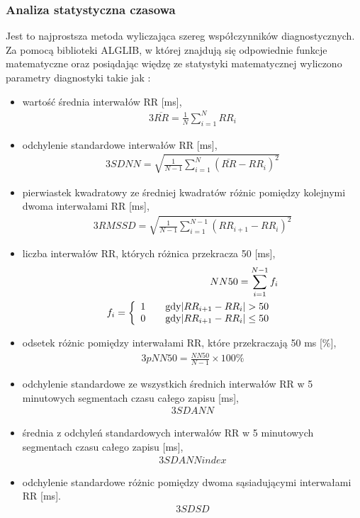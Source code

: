 \subsubsection{Analiza statystyczna czasowa }

\tab Jest to najprostsza metoda wyliczająca szereg współczynników diagnostycznych. Za pomocą biblioteki ALGLIB, w której znajdują się odpowiednie funkcje matematyczne oraz posiądając więdzę ze statystyki matematycznej wyliczono parametry diagnostyki takie jak : 

\vspace{10mm}

\begin{itemize} \itemsep0pt \parskip0pt 
\item wartość średnia interwałów RR [ms],
\begin{alignat*}{3}
\overline{RR} =  \frac{1}{N}  \sum_{i=1}^{N} RR_i
\end{alignat*}
\item odchylenie standardowe interwałów RR [ms],
\begin{alignat*}{3}
SDNN =  \sqrt{\frac{1}{N-1}\sum_{i=1}^{N} (\overline{RR} - RR_i)^{2}}
\end{alignat*}
\item pierwiastek kwadratowy ze średniej kwadratów różnic pomiędzy kolejnymi dwoma interwałami RR [ms],
\begin{alignat*}{3}
RMSSD =  \sqrt{\frac{1}{N-1}\sum_{i=1}^{N-1} (RR_{i+1} - RR_i)^{2}}
\end{alignat*}
\item liczba interwałów RR, których różnica przekracza 50 [ms],
\begin{alignat*}{3}
NN50 =  \sum_{i=1}^{N-1} f_i \\
f_i =\left\{ \begin{array}{l l} 1 & \quad \text{gdy} |RR_{i+1} - RR_i|>50 \\ 0 & \quad \text{gdy}| RR_{i+1} - RR_i|\leq 50\end{array} \right.\
\end{alignat*}
\item odsetek różnic pomiędzy interwałami RR, które przekraczają 50 ms [\%],
\begin{alignat*}{3}
pNN50 =  \frac{NN50}{N-1} \times 100  \%
\end{alignat*}
\item odchylenie standardowe ze wszystkich średnich interwałów RR w 5 minutowych segmentach czasu całego zapisu [ms],
\begin{alignat*}{3}
SDANN
\end{alignat*}
\item średnia z odchyleń standardowych interwałów RR w 5 minutowych segmentach czasu całego zapisu [ms],
\begin{alignat*}{3}
SDANN  \textit{index}
\end{alignat*}
\item odchylenie standardowe różnic pomiędzy dwoma sąsiadującymi interwałami RR [ms].
\begin{alignat*}{3}
SDSD
\end{alignat*}
\end{itemize}
